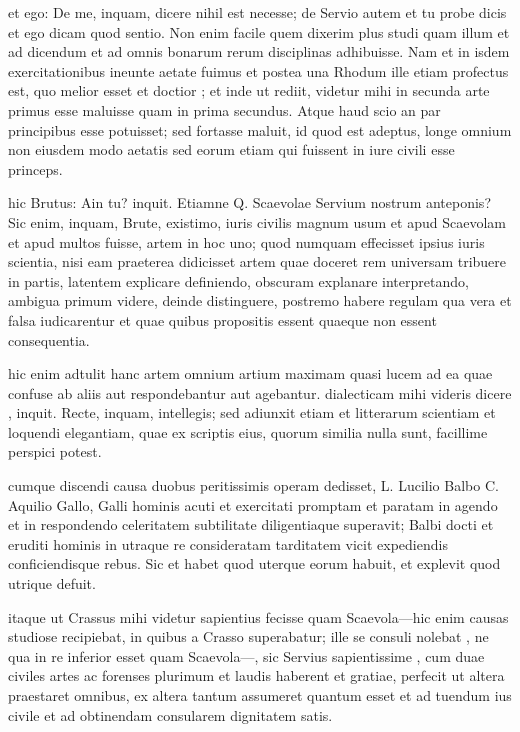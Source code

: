 et ego: De me, inquam, dicere nihil est necesse; de Servio autem et tu probe dicis et ego dicam quod sentio. Non enim facile quem dixerim plus studi quam illum et ad dicendum et ad omnis bonarum rerum disciplinas adhibuisse. Nam et in isdem exercitationibus ineunte aetate fuimus et postea una Rhodum ille etiam profectus est, quo melior esset et doctior ; et inde ut rediit, videtur mihi in secunda arte primus esse maluisse quam in prima secundus. Atque haud scio an par principibus esse potuisset; sed fortasse maluit, id quod est adeptus, longe omnium non eiusdem modo aetatis sed eorum etiam qui fuissent in iure civili esse princeps.

 hic Brutus: Ain tu? inquit. Etiamne Q. Scaevolae Servium nostrum anteponis? Sic enim, inquam, Brute, existimo, iuris civilis magnum usum et apud Scaevolam et apud multos fuisse, artem in hoc uno; quod numquam effecisset ipsius iuris scientia, nisi eam praeterea didicisset artem quae doceret rem universam tribuere in partis, latentem explicare definiendo, obscuram explanare interpretando, ambigua primum videre, deinde distinguere, postremo habere regulam qua vera et falsa iudicarentur et quae quibus propositis essent quaeque non essent consequentia.

 hic enim adtulit hanc artem omnium artium maximam quasi lucem ad ea quae confuse ab aliis aut respondebantur aut agebantur. dialecticam mihi videris dicere , inquit. Recte, inquam, intellegis; sed adiunxit etiam et litterarum scientiam et loquendi elegantiam, quae ex scriptis eius, quorum similia nulla sunt, facillime perspici potest.

 cumque discendi causa duobus peritissimis operam dedisset, L. Lucilio Balbo C. Aquilio Gallo, Galli hominis acuti et exercitati promptam et paratam in agendo et in respondendo celeritatem subtilitate diligentiaque superavit; Balbi docti et eruditi hominis in utraque re consideratam tarditatem vicit expediendis conficiendisque rebus. Sic et habet quod uterque eorum habuit, et explevit quod utrique defuit.

 itaque ut Crassus mihi videtur sapientius fecisse quam Scaevola—hic enim causas studiose recipiebat, in quibus a Crasso superabatur; ille se consuli nolebat , ne qua in re inferior esset quam Scaevola—, sic Servius sapientissime , cum duae civiles artes ac forenses plurimum et laudis haberent et gratiae, perfecit ut altera praestaret omnibus, ex altera tantum assumeret quantum esset et ad tuendum ius civile et ad obtinendam consularem dignitatem satis.

